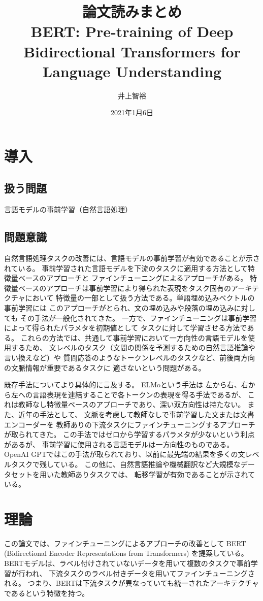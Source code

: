\documentclass{jsarticle}
\title{\vspace{-3cm}論文読みまとめ\\BERT: Pre-training of Deep Bidirectional Transformers for
Language Understanding}
\author{井上智裕}
\date{2021年1月6日}
\begin{document}
\maketitle
\vspace{-1cm}
\section{導入}
\subsection{扱う問題}
言語モデルの事前学習（自然言語処理）

\subsection{問題意識}
自然言語処理タスクの改善には、言語モデルの事前学習が有効であることが示されている。
事前学習された言語モデルを下流のタスクに適用する方法として特徴量ベースのアプローチと
ファインチューニングによるアプローチがある。
特徴量ベースのアプローチは事前学習により得られた表現をタスク固有のアーキテクチャにおいて
特徴量の一部として扱う方法である。単語埋め込みベクトルの事前学習には
このアプローチがとられ、文の埋め込みや段落の埋め込みに対しても
その手法が一般化されてきた。
一方で、ファインチューニングは事前学習によって得られたパラメタを初期値として
タスクに対して学習させる方法である。
これらの方法では、共通して事前学習において一方向性の言語モデルを使用するため、
文レベルのタスク（文間の関係を予測するための自然言語推論や言い換えなど）や
質問応答のようなトークンレベルのタスクなど、前後両方向の文脈情報が重要であるタスクに
適さないという問題がある。

既存手法についてより具体的に言及する。
ELMoという手法は
左から右、右から左への言語表現を連結することで各トークンの表現を得る手法であるが、
これは教師なし特徴量ベースのアプローチであり、深い双方向性は持たない。
また、近年の手法として、
文脈を考慮して教師なしで事前学習した文または文書エンコーダーを
教師ありの下流タスクにファインチューニングするアプローチが取られてきた。
この手法ではゼロから学習するパラメタが少ないという利点があるが、
事前学習に使用される言語モデルは一方向性のものである。
OpenAI GPTではこの手法が取られており、以前に最先端の結果を多くの文レベルタスクで残している。
この他に、自然言語推論や機械翻訳など大規模なデータセットを用いた教師ありタスクでは、
転移学習が有効であることが示されている。

\section{理論}
この論文では、ファインチューニングによるアプローチの改善として
BERT (Bidirectional Encoder Representations from Transformers) を提案している。
BERTモデルは、ラベル付けされていないデータを用いて複数のタスクで事前学習が行われ、
下流タスクのラベル付きデータを用いてファインチューニングされる。
つまり、BERTは下流タスクが異なっていても統一されたアーキテクチャであるという特徴を持つ。
\end{document}
